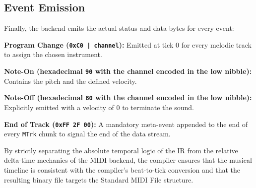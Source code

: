 \subsection{Event Emission}\label{detail-subsec:event-emission}

Finally, the backend emits the actual status and data bytes for every event:

\noindent \textbf{Program Change (\texttt{0xC0 | channel}):} Emitted at tick 0 for every melodic track to assign the
chosen instrument.

\noindent \textbf{Note-On (hexadecimal \texttt{90} with the channel encoded in the low nibble):} Contains the pitch and
the defined velocity.

\noindent \textbf{Note-Off (hexadecimal \texttt{80} with the channel encoded in the low nibble):} Explicitly
emitted with
a velocity of 0 to terminate the sound.

\noindent \textbf{End of Track (\texttt{0xFF 2F 00}):} A mandatory meta-event appended to the end of every \texttt{MTrk}
chunk to signal the end of the data stream.

By strictly separating the absolute temporal logic of the IR from the relative delta-time mechanics of the MIDI backend,
the compiler ensures that the musical timeline is consistent with the compiler's beat-to-tick conversion and
that the resulting binary file targets the Standard MIDI File structure.
